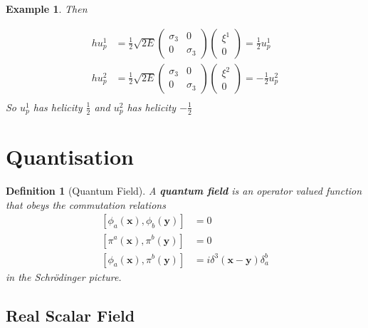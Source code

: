 \documentclass{article}
\newtheorem{definition}{Definition}[subsection]
\newtheorem{example}{Example}[subsection]
\newcommand{\bam}[1]{\textbf{#1}}
\newcommand{\comm}[2][]{\left[ #1, #2 \right]} %
\begin{document}
\begin{example}
Then

\begin{align*}
    h u_p^1 &= \frac{1}{2} \sqrt{2E} \begin{pmatrix} \sigma_3 & 0 \\ 0 & \sigma_3 \end{pmatrix} \begin{pmatrix} \xi^1 \\ 0 \end{pmatrix} = \frac{1}{2} u_p^1 \\
     h u_p^2 &= \frac{1}{2} \sqrt{2E} \begin{pmatrix} \sigma_3 & 0 \\ 0 & \sigma_3 \end{pmatrix} \begin{pmatrix} \xi^2 \\ 0 \end{pmatrix} = -\frac{1}{2} u_p^2 \\
\end{align*}
So $u_p^1$ has helicity $\frac{1}{2}$ and $u_p^2$ has helicity $-\frac{1}{2}$
\end{example}


\section{Quantisation}

\begin{definition}[Quantum Field]
A \bam{quantum field} is an operator valued function that obeys the commutation relations 
\begin{align*}
    \comm[\phi_a(\bm{x})]{\phi_b(\bm{y})} &= 0 \\
    \comm[\pi^a(\bm{x})]{\pi^b(\bm{y})} &= 0 \\
    \comm[\phi_a(\bm{x})]{\pi^b(\bm{y})} &= i\delta^3(\bm{x}-\bm{y}) \delta_a^b
\end{align*}
in the Schr\"odinger picture. 
\end{definition}

\subsection{Real Scalar Field}
\end{document}
